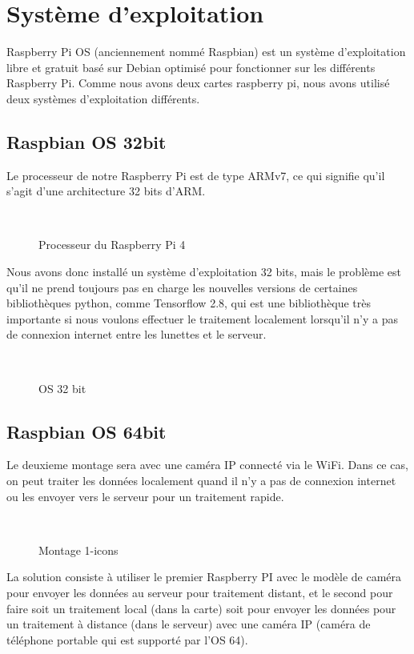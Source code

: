 {    
    

\section{Système d'exploitation}
Raspberry Pi OS (anciennement nommé Raspbian) est un système d'exploitation libre et gratuit basé sur Debian optimisé pour fonctionner sur les différents Raspberry Pi. Comme nous avons deux cartes raspberry pi, nous avons utilisé deux systèmes d'exploitation différents.
    \subsection{Raspbian OS 32bit}
    Le processeur de notre Raspberry Pi est de type ARMv7, ce qui signifie qu'il s'agit d'une architecture 32 bits d'ARM.    
        
    \begin{figure}[H] 
    \centering
    \\[0.5cm]
    \caption{Processeur du Raspberry Pi 4}
    \label{fig:figure1}
    \end{figure}
    
    Nous avons donc installé un système d'exploitation 32 bits, mais le problème est qu'il ne prend toujours pas en charge les nouvelles versions de certaines bibliothèques python, comme Tensorflow 2.8, qui est une bibliothèque très importante si nous voulons effectuer le traitement localement lorsqu'il n'y a pas de connexion internet entre les lunettes et le serveur.
    \begin{figure}[H] 
    \centering
    \\[0.5cm]
    \caption{OS 32 bit}
    \label{fig:figure12}
    \end{figure}

    \subsection{Raspbian OS 64bit}
    Le deuxieme montage sera avec une caméra IP connecté via le WiFi. Dans ce cas,  on peut traiter les données localement quand il n’y a pas de connexion internet ou les envoyer vers le serveur pour un traitement rapide.
    \begin{figure}[H] 
    \centering
    \\[0.5cm]
    \caption{Montage 1-icons}
    \label{fig:figure13}
    \end{figure}
    La solution consiste à utiliser le premier Raspberry PI avec le modèle de caméra pour envoyer les données au serveur pour traitement distant, et le second pour faire soit un traitement local (dans la carte) soit pour envoyer les données pour un traitement à distance (dans le serveur) avec une caméra IP (caméra de téléphone portable qui est supporté par l'OS 64).
}
